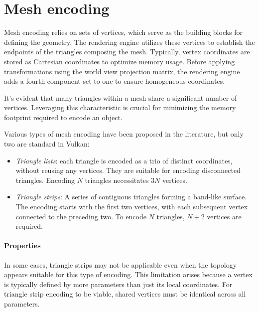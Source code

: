 \section{Mesh encoding}

Mesh encoding relies on sets of vertices, which serve as the building blocks for defining the geometry. 
The rendering engine utilizes these vertices to establish the endpoints of the triangles composing the mesh. 
Typically, vertex coordinates are stored as Cartesian coordinates to optimize memory usage. 
Before applying transformations using the world view projection matrix, the rendering engine adds a fourth component set to one to ensure homogeneous coordinates.

It's evident that many triangles within a mesh share a significant number of vertices. 
Leveraging this characteristic is crucial for minimizing the memory footprint required to encode an object.

Various types of mesh encoding have been proposed in the literature, but only two are standard in Vulkan: 
\begin{itemize}
    \item \textit{Triangle lists}: each triangle is encoded as a trio of distinct coordinates, without reusing any vertices. 
        They are suitable for encoding disconnected triangles. 
        Encoding $N$ triangles necessitates $3N$ vertices.
    \item \textit{Triangle strips}: A series of contiguous triangles forming a band-like surface. 
        The encoding starts with the first two vertices, with each subsequent vertex connected to the preceding two. 
        To encode $N$ triangles, $N+2$ vertices are required.
\end{itemize}

\paragraph*{Properties}
In some cases, triangle strips may not be applicable even when the topology appears suitable for this type of encoding. 
This limitation arises because a vertex is typically defined by more parameters than just its local coordinates. 
For triangle strip encoding to be viable, shared vertices must be identical across all parameters.